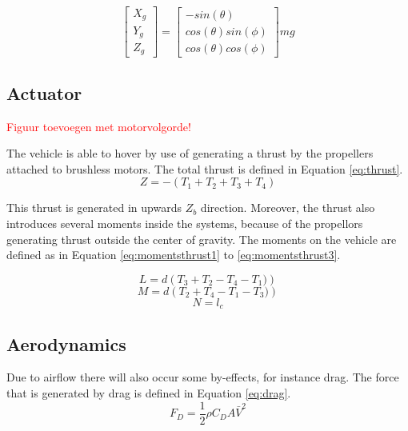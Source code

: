 \begin{equation}
\begin{bmatrix}
X_g\\
Y_g\\
Z_g
\end{bmatrix} = \begin{bmatrix}
-sin(\theta) \\cos(\theta)sin(\phi) \\ cos(\theta) cos(\phi)
\end{bmatrix} mg
\end{equation}

\subsection{Actuator}

\textcolor{red}{Figuur toevoegen met motorvolgorde!}

The vehicle is able to hover by use of generating a thrust by the propellers attached to brushless motors. The total thrust is defined in Equation \ref{eq:thrust}.
\begin{equation}\label{eq:thrust}
Z=-\left(T_1+T_2+T_3+T_4 \right)
\end{equation}

This thrust is generated in upwards $Z_b$ direction. Moreover, the thrust also introduces several moments inside the systems, because of the propellors generating thrust outside the center of gravity. The moments on the vehicle are defined as in Equation \ref{eq:momentsthrust1} to \ref{eq:momentsthrust3}.

\begin{equation} 
\label{eq:momentsthrust1}
L=d\left(T_3+T_2-T_4-T_1)\right)
\end{equation}
\begin{equation}
M=d\left(T_2+T_4-T_1-T_3)\right)
\end{equation}
\begin{equation} \label{eq:momentsthrust3}
N = l_c 
\end{equation}

\subsection{Aerodynamics}
Due to airflow there will also occur some by-effects, for instance drag. The force that is generated by drag is defined in Equation \ref{eq:drag}. 
\begin{equation}\label{eq:drag}
F_D=\frac{1}{2} \rho C_D A\bar{V}^2
\end{equation}

